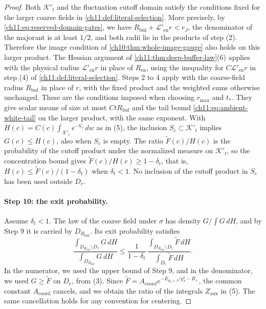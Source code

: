 \begin{proof}
Both $\mathcal K'_t$ and the fluctuation cutoff domain satisfy the conditions fixed for the larger coarse fields in \cref{ch11:def:literal-selection}. More precisely, by \eqref{ch11:eq:reserved-domain-gates}, we have $R_{\mathrm{buf}}+\mathscr L'_{\mathrm{en}}r<r_J$, the denominator of the majorant is at least $1/2$, and both radii lie in the products of step (2). Therefore the image condition of \cref{ch10:thm:whole-image-gauge} also holds on this larger product. The Hessian argument of \cref{ch11:thm:deep-buffer-law}(6) applies with the physical radius $\mathscr L'_{\mathrm{en}}r$ in place of $R_{\mathrm{en}}$, using the inequality for $C\mathscr L'_{\mathrm{en}}r$ in step (4) of \cref{ch11:def:literal-selection}. Steps 2 to 4 apply with the coarse-field radius $R_{\mathrm{buf}}$ in place of $r$, with the fixed product and the weighted sums otherwise unchanged. These are the conditions imposed when choosing $r_{\max}$ and $t_*$. They give scalar means of size at most $CtR_{\mathrm{buf}}$ and the tail bound \eqref{ch11:eq:ambient-white-tail} on the larger product, with the same exponent. With $H(c)=C(c)\int_{\mathcal K'_t}e^{-V_c}\,dw$ as in (5), the inclusion $S_c\subset\mathcal K'_t$ implies $G(c)\le H(c)$, also when $S_c$ is empty. The ratio $\widetilde F(c)/H(c)$ is the probability of the cutoff product under the normalized measure on $\mathcal K'_t$, so the concentration bound gives $\widetilde F(c)/H(c)\ge1-\delta_t$, that is, $H(c)\le\widetilde F(c)/(1-\delta_t)$ when $\delta_t<1$. No inclusion of the cutoff product in $S_c$ has been used outside $D_r$.

\paragraph{Step 10: the exit probability.}
Assume $\delta_t<1$. The law of the coarse field under $\sigma$ has density $G/\int G\,dH$, and by Step 9 it is carried by $D_{R_{\mathrm{buf}}}$. Its exit probability satisfies
\[
 \frac{\int_{D_{R_{\mathrm{buf}}}\setminus D_r}G\,dH}{\int_{D_{R_{\mathrm{buf}}}}G\,dH}
 \le\frac1{1-\delta_t}\,
 \frac{\int_{D_{R_{\mathrm{buf}}}\setminus D_r}\widetilde F\,dH}{\int_{D_r}\widetilde F\,dH}.
\]
In the numerator, we used the upper bound of Step 9, and in the denominator, we used $G\ge\widetilde F$ on $D_r$, from (3). Since $\widetilde F=A_{\mathrm{coord}}e^{-E_{d_0+J}/g_J^2-R_+}$, the common constant $A_{\mathrm{coord}}$ cancels, and we obtain the ratio of the integrals $Z_{\mathrm{aux}}$ in (5). The same cancellation holds for any convention for centering.


\end{proof}
